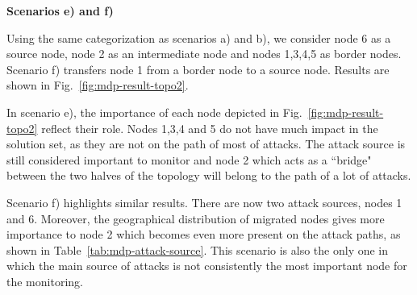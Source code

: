 \textbf{Scenarios e) and f) \\}

Using the same categorization as scenarios a) and b), we consider node 6 as a source node, node 2 as an intermediate node and nodes 1,3,4,5 as border nodes. Scenario f) transfers node 1 from a border node to a source node. Results are shown in Fig.~\ref{fig:mdp-result-topo2}.

In scenario e), the importance of each node depicted in Fig.~\ref{fig:mdp-result-topo2} reflect their role. Nodes 1,3,4 and 5 do not have much impact in the solution set, as they are not on the path of most of attacks. The attack source is still considered important to monitor and node 2 which acts as a ``bridge" between the two halves of the topology will belong to the path of a lot of attacks.

Scenario f) highlights similar results. There are now two attack sources, nodes 1 and 6. Moreover, the geographical distribution of migrated nodes gives more importance to node 2 which becomes even more present on the attack paths, as shown in Table~\ref{tab:mdp-attack-source}. This scenario is also the only one in which the main source of attacks is not consistently the most important node for the monitoring.








